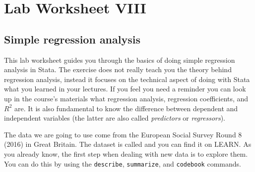 \documentclass{article}
\begin{document}
	
\section*{\hfil Lab Worksheet VIII \hfil}
\subsection*{Simple regression analysis}

This lab worksheet guides you through the basics of doing simple regression analysis in Stata. The exercise does not really teach you the theory behind regression analysis, instead it focuses on the technical aspect of doing with Stata what you learned in your lectures. If you feel you need a reminder you can look up in the course's materials what regression analysis, regression coefficients, and $R^2$ are. It is also fundamental to know the difference between dependent and independent variables (the latter are also called \textit{predictors} or \textit{regressors}).

The data we are going to use come from the European Social Survey Round 8 (2016) in Great Britain. The dataset is called and you can find it on LEARN. As you already know, the first step when dealing with new data is to explore them. You can do this by using the \texttt{describe}, \texttt{summarize}, and \texttt{codebook} commands.

 
\end{document}
